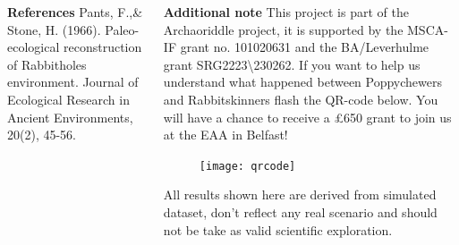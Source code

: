 \documentclass[final]{beamer}
\begin{document}
\begin{frame}[t]
\begin{columns}[t]
        \begin{block}{\textbf{References}}
             Pants, F.,\& Stone, H. (1966). Paleo-ecological reconstruction of Rabbitholes environment. Journal of Ecological Research in Ancient Environments, 20(2), 45-56.
        \end{block}
    \begin{block}{\textbf{Additional note}}
        \small
        This project is part of the Archaoriddle project, it is supported by the MSCA-IF grant no. 101020631 and the BA/Leverhulme grant SRG2223\textbackslash230262. If you want to help us understand what happened between Poppychewers and Rabbitskinners flash the QR-code below. You will have a chance to receive a £650 grant to join us at the EAA in Belfast! 
            \begin{figure}
                \texttt{[image: qrcode]}
            \end{figure}
            {\tiny  All results shown here are derived from simulated dataset, don't reflect any real scenario and should not be take as valid scientific exploration.\\
            }
        \end{block}

    \end{columns}

\end{frame}
\end{document}
